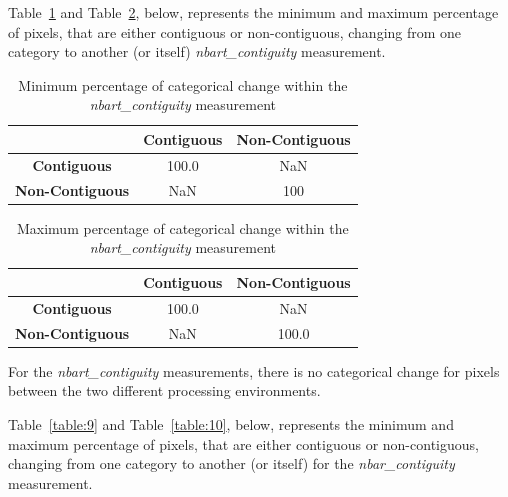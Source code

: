 \documentclass[a4paper]{article}
\begin{document}

    \begin{flushleft}
      Table~\ref{table:7} and Table~\ref{table:8}, below, represents the minimum and maximum percentage of pixels, that are either contiguous or non-contiguous, changing from one category to another (or itself) \textit{nbart\_contiguity} measurement.
    \end{flushleft}

    \begin{table}[ht!]
      \caption{Minimum percentage of categorical change within the \textit{nbart\_contiguity} measurement}\label{table:7}
      \centering
      \begin{tabular}{ccc} \midrule
        & \textbf{Contiguous} & \textbf{Non-Contiguous} \\ \midrule
        \textbf{Contiguous} & 100.0 & NaN \\
        \textbf{Non-Contiguous} & NaN & 100 \\
      \end{tabular}
    \end{table}

    \begin{table}[ht!]
      \caption{Maximum percentage of categorical change within the \textit{nbart\_contiguity} measurement}\label{table:8}
      \centering
      \begin{tabular}{ccc} \midrule
        & \textbf{Contiguous} & \textbf{Non-Contiguous} \\ \midrule
        \textbf{Contiguous} & 100.0 & NaN \\
        \textbf{Non-Contiguous} & NaN & 100.0 \\
      \end{tabular}
    \end{table}

    \begin{flushleft}
      For the \textit{nbart\_contiguity} measurements, there is no categorical change for pixels between the two different processing environments.
    \end{flushleft}

    \begin{flushleft}
      Table~\ref{table:9} and Table~\ref{table:10}, below, represents the minimum and maximum percentage of pixels, that are either contiguous or non-contiguous, changing from one category to another (or itself) for the \textit{nbar\_contiguity} measurement.
    \end{flushleft}
\end{document}
